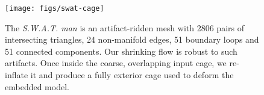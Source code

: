 

\begin{figure}
  \texttt{[image: figs/swat-cage]}
  \caption{The \emph{S.W.A.T. man} is an artifact-ridden mesh with 2806 pairs
  of intersecting triangles, 24 non-manifold edges, 51 boundary loops and 51
  connected components. Our shrinking flow is robust to such artifacts. Once
  inside the coarse, overlapping input cage, we re-inflate it and produce a
  fully exterior cage used to deform the embedded model.}
  \label{fig:swat-cage}
\end{figure}


